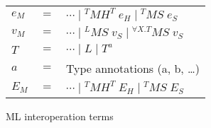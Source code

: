 \begin{figure}
\begin{center}
\begin{tabular}{lcl}
$e_{M}$ & $=$ & $\cdots\;\vert\;^{T}MH^{T}\;e_{H}\;\vert\;^{T}MS\;e_{S}$ \\
$v_{M}$ & $=$ & $\cdots\;\vert\;^{L}MS\;v_{S}\;\vert\;^{\forall X.T}MS\;v_{S}$ \\
$T$ & $=$ & $\cdots\;\vert\;L\;\vert\;T^{a}$ \\
$a$ & $=$ & Type annotations (a, b, \ldots) \\
$E_{M}$ & $=$ & $\cdots\;\vert\;^{T}MH^{T}\;E_{H}\;\vert\;^{T}MS\;E_{S}$
\end{tabular}
\end{center}
\caption{ML interoperation terms}
\label{fig:mit}
\end{figure}